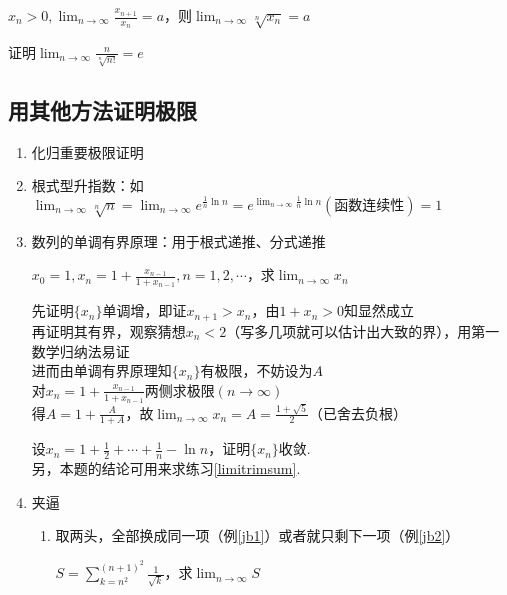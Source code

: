 \begin{exercise}
$\displaystyle x_n>0,\lim_{n\to\infty}\frac{x_{n+1}}{x_n}=a$，则$\displaystyle\lim_{n\to\infty}\sqrt[n]{x_n}=a$%
\end{exercise}
\begin{exercise}
证明$\displaystyle\lim_{n\to\infty}\frac{n}{\sqrt[n]{n!}}=e$%
\end{exercise}

\subsection{用其他方法证明极限}
\begin{enumerate}
	\item 化归重要极限证明
	\item 根式型升指数：如$\displaystyle \lim_{n\to\infty}\sqrt[n]{n}=\lim_{n\to\infty} e^{\frac{1}{n}\ln n}=e^{\lim_{n\to\infty}\frac{1}{n}\ln n}(\text{函数连续性})=1$
	\item 数列的单调有界原理：用于根式递推、分式递推
	\begin{example}
	$\displaystyle x_0=1,x_n=1+\frac{x_{n-1}}{1+x_{n-1}},n=1,2,\cdots$，求$\displaystyle\lim_{n\to\infty}x_n$
	\end{example}
	\begin{analysis}
	先证明$\{x_n\}$单调增，即证$x_{n+1}>x_n$，由$1+x_n>0$知显然成立\\
	再证明其有界，观察猜想$x_n<2$（写多几项就可以估计出大致的界），用第一数学归纳法易证\\
	进而由单调有界原理知$\{x_n\}$有极限，不妨设为$A$\\
	对$\displaystyle x_n=1+\frac{x_{n-1}}{1+x_{n-1}}$两侧求极限$(n\to\infty)$\\
	得$\displaystyle A=1+\frac{A}{1+A}$，故$\displaystyle\lim_{n\to\infty}x_n=A=\frac{1+\sqrt{5}}{2}$（已舍去负根）
	\end{analysis}
	\begin{exercise}
	设$\displaystyle x_n=1+\frac{1}{2}+\cdots+\frac{1}{n}-\ln n$，证明$\{x_n\}$收敛.\\
	另，本题的结论可用来求练习\ref{limitrimsum}.
	\end{exercise}
	\item 夹逼
	\begin{enumerate}
		\item 取两头，全部换成同一项（例\ref{jb1}）或者就只剩下一项（例\ref{jb2}）
		\begin{example}
		\label{jb1}
		$\displaystyle S=\sum _{k=n^2}^{(n+1)^2} \frac{1}{\sqrt{k}}$，求$\displaystyle\lim_{n\to\infty}S$

\end{example}
\end{enumerate}
\end{enumerate}
